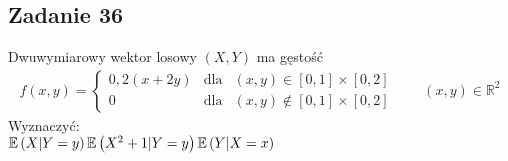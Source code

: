 %


\subsection*{Zadanie 36}
Dwuwymiarowy wektor losowy $ (X,Y) $ ma gęstość
\begin{gather*}
f(x,y)=\left \{
\begin{array}{cll}
	0,2(x+2y) & \text{dla} & (x,y)\in[0,1] \times [0,2]   \\
	    0     & \text{dla} & (x,y)\notin[0,1]\times [0,2]
\end{array}
\right .
\qquad (x,y)\in \mathbb R ^2
\end{gather*}
Wyznaczyć:\\
$ \mathbb E \left(X|Y=y\right)\\
\mathbb E \left(X^2+1|Y=y\right) \\
\mathbb E \left(Y|X=x\right)$

